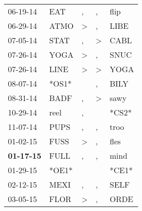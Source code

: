 \begin{supertabular}{p{0.07\textwidth}p{0.06\textwidth}p{0.02\textwidth}p{0.02\textwidth}p{0.06\textwidth}}
          06-19-14\textsuperscript{} &            EAT\textsuperscript{} &                , &                , &           flip\textsuperscript{} \\
          06-29-14\textsuperscript{} &           ATMO\textsuperscript{} &     \textgreater &                , &           LIBE\textsuperscript{} \\
          07-05-14\textsuperscript{} &           STAT\textsuperscript{} &                , &     \textgreater &           CABL\textsuperscript{} \\
          07-26-14\textsuperscript{} &           YOGA\textsuperscript{} &     \textgreater &                , &           SNUC\textsuperscript{} \\
          07-26-14\textsuperscript{} &           LINE\textsuperscript{} &     \textgreater &     \textgreater &           YOGA\textsuperscript{} \\
          08-07-14\textsuperscript{} &                            *OS1* &                  &                , &           BILY\textsuperscript{} \\
          08-31-14\textsuperscript{} &           BADF\textsuperscript{} &                , &     \textgreater &           sawy\textsuperscript{} \\
          10-29-14\textsuperscript{} &           reel\textsuperscript{} &                , &                  &                            *CS2* \\
          11-07-14\textsuperscript{} &           PUPS\textsuperscript{} &                , &                , &           troo\textsuperscript{} \\
          01-02-15\textsuperscript{} &           FUSS\textsuperscript{} &     \textgreater &                , &           fles\textsuperscript{} \\
 \textbf{01-17-15\textsuperscript{}} &           FULL\textsuperscript{} &                , &                , &           mind\textsuperscript{} \\
          01-29-15\textsuperscript{} &                            *OE1* &                  &                  &                            *CE1* \\
          02-12-15\textsuperscript{} &           MEXI\textsuperscript{} &                , &                , &           SELF\textsuperscript{} \\
          03-05-15\textsuperscript{} &           FLOR\textsuperscript{} &     \textgreater &                , &           ORDE\textsuperscript{} \\

\end{supertabular}
